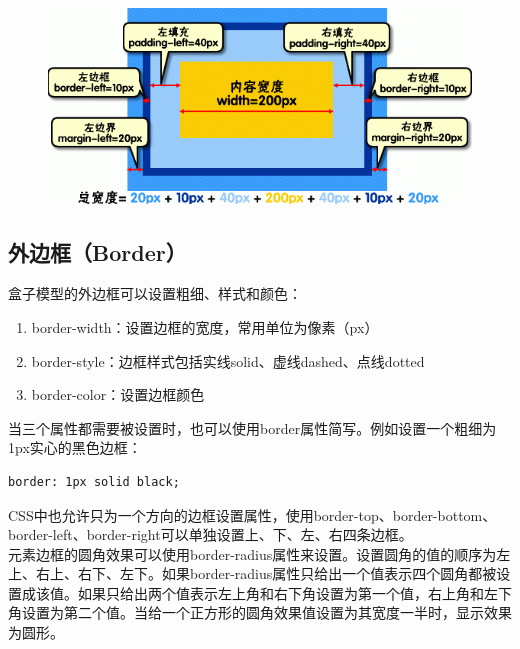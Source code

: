 \begin{figure}[H]
	\centering
	\includegraphics[]{img/C8/8-2/2.png}
\end{figure}

\subsection{外边框（Border）}

盒子模型的外边框可以设置粗细、样式和颜色：

\begin{enumerate}
	\item border-width：设置边框的宽度，常用单位为像素（px）
	\item border-style：边框样式包括实线solid、虚线dashed、点线dotted
	\item border-color：设置边框颜色
\end{enumerate}

当三个属性都需要被设置时，也可以使用border属性简写。例如设置一个粗细为1px实心的黑色边框： \\

\begin{lstlisting}[style=htmlcssjs]
border: 1px solid black;
\end{lstlisting}

CSS中也允许只为一个方向的边框设置属性，使用border-top、border-bottom、border-left、border-right可以单独设置上、下、左、右四条边框。 \\

元素边框的圆角效果可以使用border-radius属性来设置。设置圆角的值的顺序为左上、右上、右下、左下。如果border-radius属性只给出一个值表示四个圆角都被设置成该值。如果只给出两个值表示左上角和右下角设置为第一个值，右上角和左下角设置为第二个值。当给一个正方形的圆角效果值设置为其宽度一半时，显示效果为圆形。 \\

 \\

